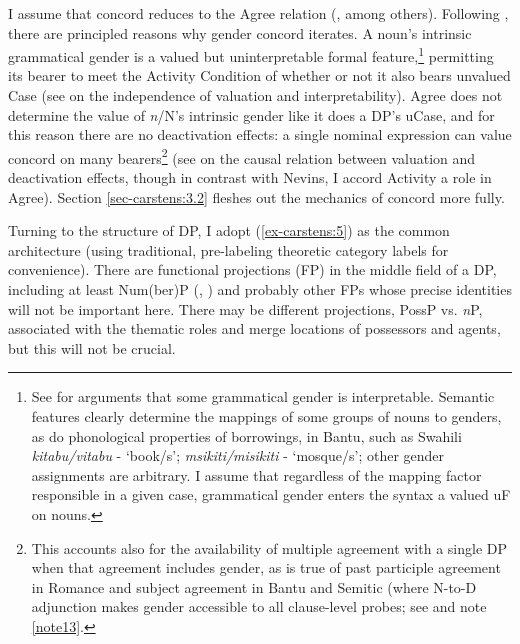 \documentclass[output=paper
,modfonts
,nonflat]{langsci/langscibook}
\begin{document}
I assume that concord reduces to the Agree relation (\citealt{Carstens2000,Koopman2006,Baker2008a,Danon2011,Toosarvandani_Van_Urk2014}, among others). Following \citet{Carstens2010, Carstens2011}, there are principled reasons why gender concord iterates. A noun's intrinsic grammatical gender is a valued but uninterpretable formal feature,\footnote{See \citet{Kramer2015} for arguments that some grammatical gender is interpretable. Semantic features clearly determine the mappings of some groups of nouns to genders, as do phonological properties of borrowings, in Bantu, such as Swahili \textit{kitabu/vitabu} - `book/s'; \textit{msikiti/misikiti} - `mosque/s'; other gender assignments are arbitrary. I assume that regardless of the mapping factor responsible in a given case, grammatical gender enters the syntax a valued uF on nouns.} permitting its bearer to meet the Activity Condition of \citet{Chomsky2001} whether or not it also bears unvalued Case (see \citealt{Pesetsky_Torrego2007} on the independence of valuation and interpretability). Agree does not determine the value of \textit{n}/N’s intrinsic gender like it does a DP's uCase, and for this reason there are no {\textquotedbl}deactivation{\textquotedbl} effects: a single nominal expression can value concord on many bearers\footnote{\label{fn:6}This accounts also for the availability of multiple agreement with a single DP when that agreement includes gender, as is true of past participle agreement in Romance and subject agreement in Bantu and Semitic (where N-to-D adjunction makes gender accessible to all clause-level probes; see \citealt{Carstens2011} and note \ref{note13}.} (see \citealt{Nevins2005} on the causal relation between valuation and deactivation effects, though in contrast with Nevins, I accord Activity a role in Agree). Section \ref{sec-carstens:3.2} fleshes out the mechanics of concord more fully.

Turning to the structure of DP, I adopt (\ref{ex-carstens:5}) as the common architecture (using traditional, pre-labeling theoretic category labels for convenience). There are functional projections (FP) in the middle field of a DP, including at least Num(ber)P (\citealt{Carstens1991}, \citealt{Ritter1991, Ritter1992}) and probably other FPs whose precise identities will not be important here. There may be different projections, PossP vs. \textit{n}P, associated with the thematic roles and merge locations of possessors and agents, but this will not be crucial.
\end{document}

